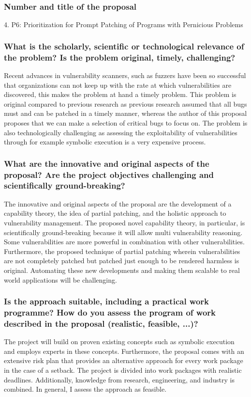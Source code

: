 \subsubsection*{Number and title of the proposal}
4. P6: Prioritization for Prompt Patching of Programs with Pernicious Problems

\subsubsection*{What is the scholarly, scientific or technological relevance of the problem? Is the problem original, timely, challenging?}
Recent advances in vulnerability scanners, such as fuzzers have been so successful that organizations can not keep up with the rate at which vulnerabilities are discovered, this makes the problem at hand a timely problem. This problem is original compared to previous research as previous research assumed that all bugs must and can be patched in a timely manner, whereas the author of this proposal proposes that we can make a selection of critical bugs to focus on. The problem is also technologically challenging as assessing the exploitability of vulnerabilities through for example symbolic execution is a very expensive process.

\subsubsection*{What are the innovative and original aspects of the proposal? Are the project objectives challenging and scientifically ground-breaking?}
The innovative and original aspects of the proposal are the development of a capability theory, the idea of partial patching, and the holistic approach to vulnerability management. The proposed novel capability theory, in particular, is scientifically ground-breaking because it will allow multi vulnerability reasoning. Some vulnerabilities are more powerful in combination with other vulnerabilities. Furthermore, the proposed technique of partial patching wherein vulnerabilities are not completely patched but patched just enough to be rendered harmless is original. Automating these new developments and making them scalable to real world applications will be challenging.

\subsubsection*{Is the approach suitable, including a practical work programme? How do you assess the program of work described in the proposal (realistic, feasible, ...)?}
The project will build on proven existing concepts such as symbolic execution and employs experts in these concepts. Furthermore, the proposal comes with an extensive risk plan that provides an alternative approach for every work package in the case of a setback. The project is divided into work packages with realistic deadlines. Additionally, knowledge from research, engineering, and industry is combined. In general, I assess the approach as feasible.

